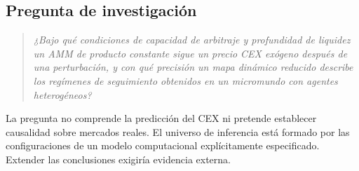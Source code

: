 \FloatBarrier
\begin{samepage}
\section{Pregunta de investigación}

\begin{quote}
\emph{¿Bajo qué condiciones de capacidad de arbitraje y profundidad de liquidez un AMM de producto constante sigue un precio CEX exógeno después de una perturbación, y con qué precisión un mapa dinámico reducido describe los regímenes de seguimiento obtenidos en un micromundo con agentes heterogéneos?}
\end{quote}
\end{samepage}

La pregunta no comprende la predicción del CEX ni pretende establecer causalidad sobre mercados reales. El universo de inferencia está formado por las configuraciones de un modelo computacional explícitamente especificado. Extender las conclusiones exigiría evidencia externa.
